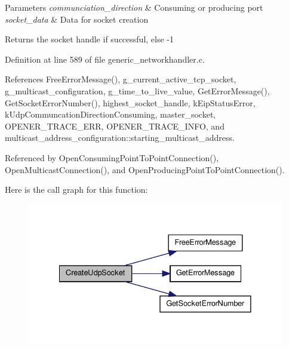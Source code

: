 \begin{DoxyParams}{\-Parameters}
{\em communciation\-\_\-direction} & \-Consuming or producing port \\
\hline
{\em socket\-\_\-data} & \-Data for socket creation\\
\hline
\end{DoxyParams}
\begin{DoxyReturn}{\-Returns}
the socket handle if successful, else -\/1 
\end{DoxyReturn}


\-Definition at line 589 of file generic\-\_\-networkhandler.\-c.



\-References \-Free\-Error\-Message(), g\-\_\-current\-\_\-active\-\_\-tcp\-\_\-socket, g\-\_\-multicast\-\_\-configuration, g\-\_\-time\-\_\-to\-\_\-live\-\_\-value, \-Get\-Error\-Message(), \-Get\-Socket\-Error\-Number(), highest\-\_\-socket\-\_\-handle, k\-Eip\-Status\-Error, k\-Udp\-Communcation\-Direction\-Consuming, master\-\_\-socket, \-O\-P\-E\-N\-E\-R\-\_\-\-T\-R\-A\-C\-E\-\_\-\-E\-R\-R, \-O\-P\-E\-N\-E\-R\-\_\-\-T\-R\-A\-C\-E\-\_\-\-I\-N\-F\-O, and multicast\-\_\-address\-\_\-configuration\-::starting\-\_\-multicast\-\_\-address.



\-Referenced by \-Open\-Consuming\-Point\-To\-Point\-Connection(), \-Open\-Multicast\-Connection(), and \-Open\-Producing\-Point\-To\-Point\-Connection().



\-Here is the call graph for this function\-:
\nopagebreak
\begin{figure}[H]
\begin{center}
\leavevmode
\includegraphics[width=332pt]{d5/dc5/group__CIP__CALLBACK__API_gadae462526ab01253d39e4a54346f56ca_cgraph}
\end{center}
\end{figure}




